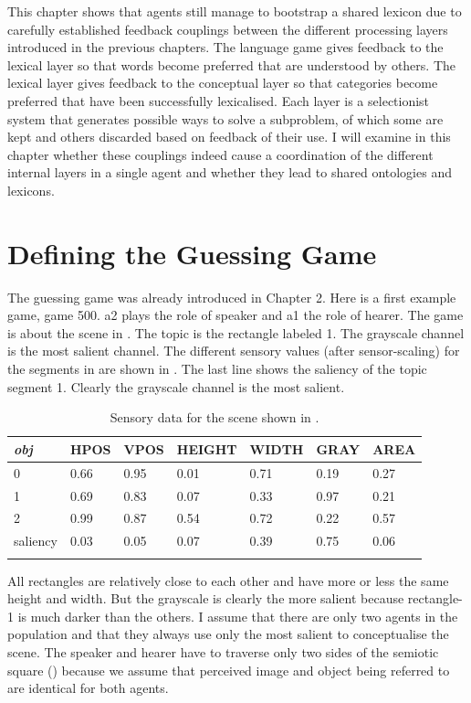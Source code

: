 This chapter shows that agents still manage to 
bootstrap a shared lexicon due to carefully established
feedback couplings between the different processing
layers introduced in the previous chapters. 
The language game gives feedback to the lexical layer so 
that words become preferred that are understood by others.
The lexical layer gives feedback to the conceptual layer
so that categories become preferred that have been
successfully lexicalised. Each layer is a selectionist system
that generates possible ways to solve a subproblem, of which some 
are kept and others discarded based on feedback of their use.
I will examine in this chapter whether these
couplings indeed cause a coordination of the different internal
layers in a single agent and whether they lead to shared 
ontologies and lexicons. 

\section{Defining the Guessing Game}

The guessing game was already introduced in Chapter 2. Here is a first example game, game 500.
{\bfshape  a2} plays the role of speaker and {\bfshape  a1} the role of hearer. The game is about the scene in
. The topic is the rectangle labeled 1. The grayscale channel is the most 
salient channel. The different sensory values (after sensor-scaling)
for the segments in  are shown in 
. The last line shows the saliency of 
the topic segment 1.  Clearly the grayscale channel is the most salient. 


\begin{table}
\begin{center}
\begin{tabular}{ l  l  l  l  l  l  l }
\lsptoprule
{\itshape obj} & HPOS & VPOS & HEIGHT & WIDTH & GRAY & AREA \\ \midrule
0 & 0.66 & 0.95 & 0.01 & 0.71 & 0.19 & 0.27\\ 
1 & 0.69 & 0.83 & 0.07 & 0.33 & 0.97 & 0.21\\ 
2 & 0.99 & 0.87 & 0.54 & 0.72 & 0.22 & 0.57\\ 
saliency & 0.03 & 0.05 & 0.07 & 0.39 & 0.75 & 0.06 \\ 
\lspbottomrule
\end{tabular}
\caption{\label{tab:t-rect1} Sensory data for the scene shown in .}
\end{center}
\end{table}
All rectangles are relatively close to each other and have more or less the 
same height and width. But the grayscale is clearly the more salient because rectangle-1 is 
much darker than the others. I assume that there are only two agents in the population and that they always use only 
the most salient to conceptualise the scene. 
The speaker and hearer have to traverse only 
two sides of the semiotic square ()
because we assume that perceived image and object being
referred to are identical for both agents. 


